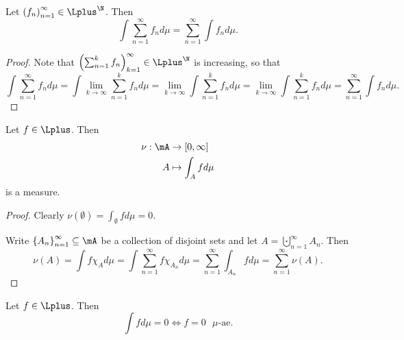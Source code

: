 \documentclass[pmath451]{subfiles}
\begin{document}
    \begin{prop}{}
        Let $\left( f_{n} \right)^{\infty}_{n=1}\in\Lplus^{\N}$. Then
        \begin{equation*}
            \int\sum^{\infty}_{n=1}f_nd\mu = \sum^{\infty}_{n=1}\int f_nd\mu.
        \end{equation*}
    \end{prop}

    \begin{proof}
        Note that $\left( \sum^{k}_{n=1}f_n \right)^{\infty}_{k=1}\in\Lplus^{\N}$ is increasing, so that
        \begin{equation*}
            \int\sum^{\infty}_{n=1}f_nd\mu = \int\lim_{k\to\infty}\sum^{k}_{n=1}f_nd\mu = \lim_{k\to\infty}\int\sum^{k}_{n=1}f_nd\mu = \lim_{k\to\infty}\int \sum^{k}_{n=1}f_nd\mu = \sum^{\infty}_{n=1}\int f_nd\mu.
        \end{equation*}
    \end{proof}
    
    \begin{prop}{}
        Let $f\in\Lplus$. Then
        \begin{equation*}
            \begin{aligned}
                \nu:\mA&\to\left[ 0,\infty \right] \\
                A & \mapsto \int_Afd\mu
            \end{aligned} 
        \end{equation*}
        is a measure.
    \end{prop}

    \begin{proof}
        Clearly $\nu\left( \emptyset \right) = \int_{\emptyset}fd\mu = 0$. 

        Write $\left\lbrace A_n \right\rbrace^{\infty}_{n=1}\subseteq\mA$ be a collection of disjoint sets and let $A = \bigcupdot^{\infty}_{n=1}A_n$. Then
        \begin{equation*}
            \nu\left( A \right) = \int f\chi_Ad\mu = \int\sum^{\infty}_{n=1}f\chi_{A_n}d\mu = \sum^{\infty}_{n=1}\int_{A_n}fd\mu = \sum^{\infty}_{n=1}\nu\left( A \right).
        \end{equation*}
    \end{proof}

    \clearpage
    
    \begin{lemma}{}
        Let $f\in\Lplus$. Then
        \begin{equation*}
            \int fd\mu = 0 \iff f=0\text{ $\mu$-ae}.
        \end{equation*}
    \end{lemma}
    
\end{document}
